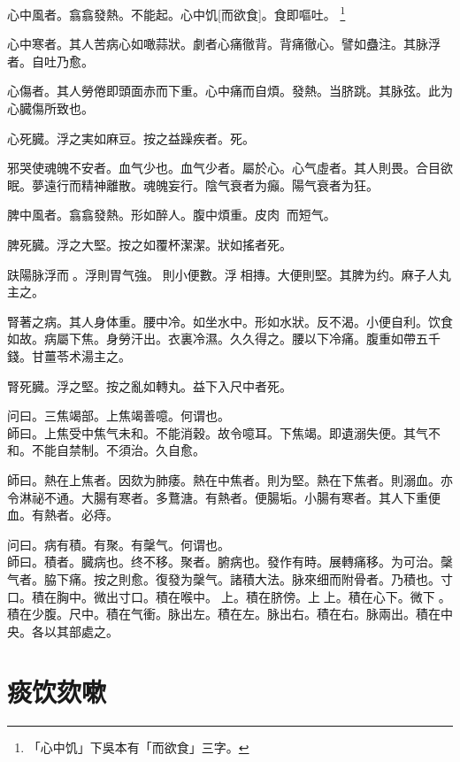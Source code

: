 \documentclass[oneside,b4paper]{ctexbook}
\begin{document}
\begin{flushleft}
心中風者。翕翕發熱。不能起。心中饥[而欲食]。食即嘔吐。
\footnote{「心中饥」下吳本有「而欲食」三字。}

心中寒者。其人苦病心如噉蒜狀。劇者心痛徹背。背痛徹心。譬如蠱注。其脉浮者。自吐乃愈。

心傷者。其人勞倦即頭面赤而下重。心中痛而自煩。發熱。当脐跳。其脉弦。此为心臓傷所致也。

心死臓。浮之実如麻豆。按之益躁疾者。死。

邪哭使魂魄不安者。血气少也。血气少者。屬於心。心气虛者。其人則畏。合目欲眠。夢遠行而精神離散。魂魄妄行。陰气衰者为癲。陽气衰者为狂。

脾中風者。翕翕發熱。形如醉人。腹中煩重。皮肉{𥆧}{𥆧}而短气。

脾死臓。浮之大堅。按之如覆杯潔潔。狀如搖者死。

趺陽脉浮而{𬈧}。浮則胃气強。{𬈧}則小便數。浮{𬈧}相摶。大便則堅。其脾为约。麻子人丸主之。

腎著之病。其人身体重。腰中冷。如坐水中。形如水狀。反不渴。小便自利。饮食如故。病屬下焦。身勞汗出。衣裏冷濕。久久得之。腰以下冷痛。腹重如帶五千錢。甘薑苓术湯主之。

腎死臓。浮之堅。按之亂如轉丸。益下入尺中者死。

问曰。三焦竭部。上焦竭善噫。何谓也。\\
師曰。上焦受中焦气未和。不能消穀。故令噫耳。下焦竭。即遺溺失便。其气不和。不能自禁制。不須治。久自愈。

師曰。熱在上焦者。因欬为肺痿。熱在中焦者。則为堅。熱在下焦者。則溺血。亦令淋祕不通。大腸有寒者。多鶩溏。有熱者。便腸垢。小腸有寒者。其人下重便血。有熱者。必痔。

问曰。病有積。有聚。有䅽气。何谓也。\\
師曰。積者。臓病也。终不移。聚者。腑病也。發作有時。展轉痛移。为可治。䅽气者。脇下痛。按之則愈。復發为䅽气。諸積大法。脉來细而附骨者。乃積也。寸口。積在胸中。微出寸口。積在喉中。{𬮦}上。積在脐傍。上{𬮦}上。積在心下。微下{𬮦}。積在少腹。尺中。積在气衝。脉出左。積在左。脉出右。積在右。脉兩出。積在中央。各以其部處之。

\chapter{痰饮欬嗽}


\end{flushleft}
\end{document}
